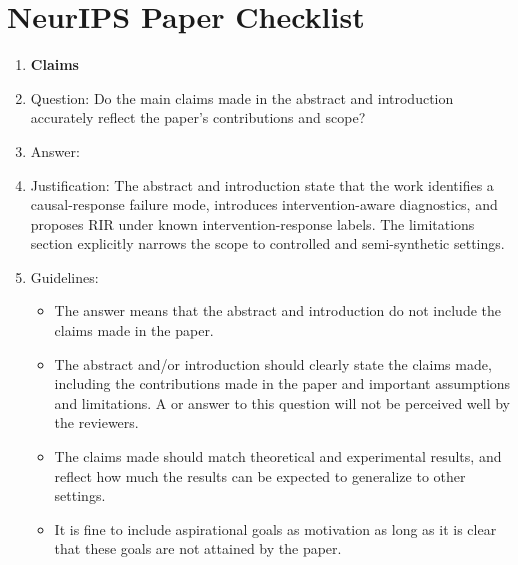 \section*{NeurIPS Paper Checklist}

\begin{enumerate}

\item {\bf Claims}
    \item[] Question: Do the main claims made in the abstract and introduction accurately reflect the paper's contributions and scope?
    \item[] Answer: \answerYes{}
    \item[] Justification: The abstract and introduction state that the work identifies a causal-response failure mode, introduces intervention-aware diagnostics, and proposes RIR under known intervention-response labels. The limitations section explicitly narrows the scope to controlled and semi-synthetic settings.
    \item[] Guidelines:
    \begin{itemize}
        \item The answer \answerNA{} means that the abstract and introduction do not include the claims made in the paper.
        \item The abstract and/or introduction should clearly state the claims made, including the contributions made in the paper and important assumptions and limitations. A \answerNo{} or \answerNA{} answer to this question will not be perceived well by the reviewers. 
        \item The claims made should match theoretical and experimental results, and reflect how much the results can be expected to generalize to other settings. 
        \item It is fine to include aspirational goals as motivation as long as it is clear that these goals are not attained by the paper. 
    \end{itemize}


\end{enumerate}
